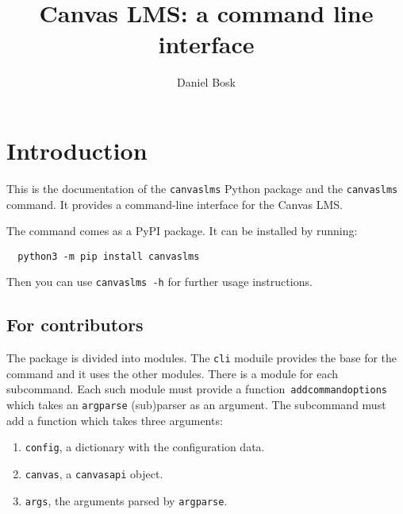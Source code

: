 \documentclass[a4paper,oneside]{book}
\title{%
  Canvas LMS: a command line interface
}
\author{%
  Daniel Bosk
}
\affil{%
  KTH EECS
}
\newenvironment{abstract}{}{}
\begin{document}
\frontmatter
\maketitle

\vspace*{\fill}
\clearpage

\begin{abstract}
  
\end{abstract}
\clearpage


\tableofcontents
\clearpage

\mainmatter


\chapter{Introduction}

This is the documentation of the \texttt{canvaslms} Python package and the 
\texttt{canvaslms} command.
It provides a command-line interface for the Canvas LMS\@.

The command comes as a PyPI package.
It can be installed by running:
\begin{verbatim}
  python3 -m pip install canvaslms
\end{verbatim}
Then you can use \texttt{canvaslms -h} for further usage instructions.

\section{For contributors}

The package is divided into modules.
The \texttt{cli} moduile provides the base for the command and it uses the 
other modules.
There is a module for each subcommand.
Each such module must provide a
function~\texttt{add\textunderscore{}command\textunderscore{}options} which 
takes an \texttt{argparse} (sub)parser as an argument.
The subcommand must add a function which takes three arguments:
\begin{enumerate}
  \item \texttt{config}, a dictionary with the configuration data.
  \item \texttt{canvas}, a \texttt{canvasapi} object.
  \item \texttt{args}, the arguments parsed by \texttt{argparse}.
\end{enumerate}





%
%
%
%


\printbibliography
\end{document}
